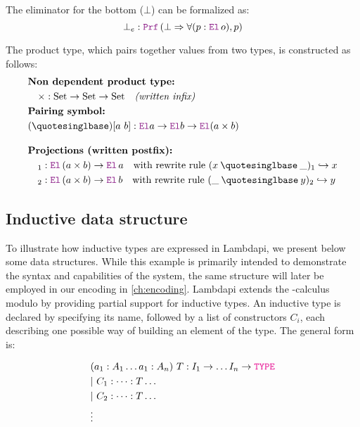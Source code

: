 \begin{example}
The eliminator for the bottom ($\bot$) can be formalized as:
\[ \bot_e : \prf\,(\bot \Rightarrow \forall (p: \el\,o), p) \]
\end{example}

\begin{example}\label{def-product}
The product type, which pairs together values from two types, is constructed as follows:
\begin{align*}
&\textbf{Non dependent product type:} \\
&\quad \times : \text{Set} \to \text{Set} \to \text{Set} \quad \textit{(written infix)} \\
&\textbf{Pairing symbol:} \\
&(\mathbin{‚}) [a~b] : \el a \ra \el b \ra \el (a \times b)\\[1em]
&\textbf{Projections (written postfix):}  \\
&\quad {}_1 : \el\, (a \times b) \ra \el\, a \quad \text{with rewrite rule } (x \mathbin{‚} \_)_1 \re x \\
&\quad {}_2 : \el\, (a \times b) \ra \el\, b \quad \text{with rewrite rule } (\_ \mathbin{‚} y)_2 \re y
\end{align*}
\end{example}


\subsection{Inductive data structure}

To illustrate how inductive types are expressed in Lambdapi, we present below some data structures.
While this example is primarily intended to demonstrate the syntax and capabilities of the system, the same structure will later be employed in our encoding in \cref{ch:encoding}.
Lambdapi extends the \lpm-calculus modulo by providing partial support for inductive types.
An inductive type is declared by specifying its name, followed by a list of constructors $C_i$, each describing one possible way of building an element of the type.
The general form is:

\begin{align*}
&(a_1 : A_1 \dots a_1 : A_n)~T : I_1 \ra \dots I_n \ra \type\\
&|~C_1 : \dots : T \dots\\
&|~C_2 : \dots : T \dots\\
&\vdots
\end{align*}

